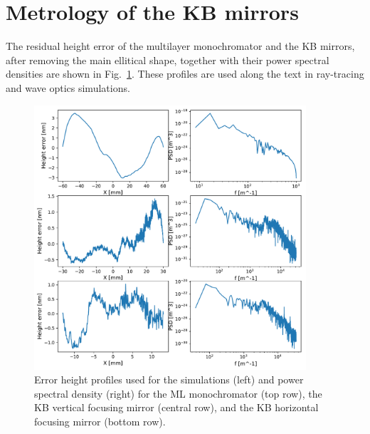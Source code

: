 \documentclass{iucr}              %
\begin{document}

\appendix

\section{Metrology of the KB mirrors}
\label{appendix:metrology}
The residual height error of the multilayer monochromator and the KB mirrors, after removing the main ellitical shape, together with their power spectral densities are shown in Fig.~\ref{fig:metrology}. These profiles are used along the text in ray-tracing and wave optics simulations.

\begin{figure}\label{fig:metrology}
\includegraphics[width=0.9\textwidth]{GRAPHICS/metrology.pdf}
\caption{Error height profiles used for the simulations (left) and power spectral density (right) for the ML monochromator (top row), the KB vertical focusing mirror (central row), and the KB horizontal focusing mirror (bottom row).}
\end{figure}





\end{document}

